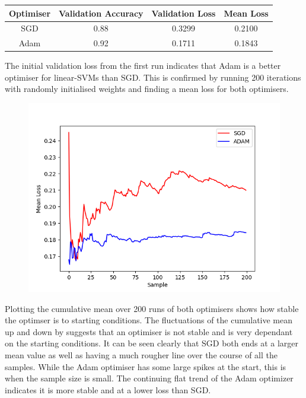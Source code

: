 \documentclass[sigconf]{acmart}
\begin{document}
\begin{center}
    \begin{tabular}{| c c c c |}
        \hline
        Optimiser & Validation Accuracy & Validation Loss & Mean Loss \\ 
        \hline\hline
        SGD & 0.88 & 0.3299 & 0.2100 \\
        Adam & 0.92 & 0.1711 & 0.1843 \\
        \hline      
    \end{tabular}
\end{center}

The initial validation loss from the first run indicates that Adam is a better optimiser for linear-SVMs than SGD. This is confirmed by running 200 iterations with randomly initialised weights and finding a mean loss for both optimisers.

\begin{figure}[H]
    \centering
    \includegraphics[scale=0.5]{"svm.png"}
\end{figure}

Plotting the cumulative mean over 200 runs of both optimisers shows how stable the optimser is to starting conditions.
The fluctuations of the cumulative mean up and down by suggests that an optimiser is not stable and is very dependant on the starting conditions.
It can be seen clearly that SGD both ends at a larger mean value as well as having a much rougher line over the course of all the samples. 
While the Adam optimiser has some large spikes at the start, this is when the sample size is small. The continuing flat trend of the Adam optimizer indicates it is more stable and at a lower loss than SGD.
\end{document}
